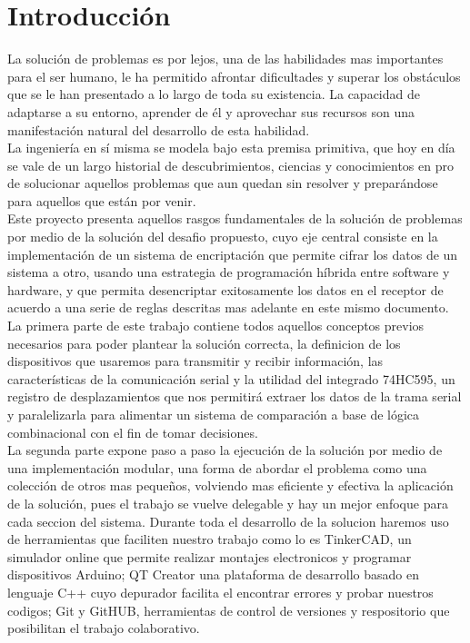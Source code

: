 \documentclass{article}
\begin{document}
\section{Introducción}\label{intro}
La solución de problemas es por lejos, una de las habilidades mas importantes para el ser humano, le ha permitido afrontar dificultades y superar los obstáculos que se le han presentado a lo largo de toda su existencia. La capacidad de adaptarse a su entorno, aprender de él y aprovechar sus recursos son una manifestación natural del desarrollo de esta habilidad.\\
La ingeniería en sí misma se modela bajo esta premisa primitiva, que hoy en día se vale de un largo historial de descubrimientos, ciencias y conocimientos en pro de solucionar aquellos problemas que aun quedan sin resolver y preparándose para aquellos que están por venir.\\

Este proyecto presenta aquellos rasgos fundamentales de la solución de problemas por medio de la solución del desafio propuesto, cuyo eje central consiste en la implementación de un sistema de encriptación que permite cifrar los datos de un sistema a otro, usando una estrategia de programación híbrida entre software y hardware, y que permita desencriptar exitosamente los datos en el receptor de acuerdo a una serie de reglas descritas mas adelante en este mismo documento.\\

La primera parte de este trabajo contiene todos aquellos conceptos previos necesarios para poder plantear la solución correcta, la definicion de los dispositivos que usaremos para transmitir y recibir información, las características de la comunicación serial y la utilidad del integrado 74HC595, un registro de desplazamientos que nos permitirá extraer los datos de la trama serial y paralelizarla para alimentar un sistema de comparación a base de lógica combinacional con el fin de tomar decisiones.\\

La segunda parte expone paso a paso la ejecución de la solución por medio de una implementación modular, una forma de abordar el problema como una colección de otros mas pequeños, volviendo mas eficiente y efectiva la aplicación de la solución, pues el trabajo se vuelve delegable y hay un mejor enfoque para cada seccion del sistema. Durante toda el desarrollo de la solucion haremos uso de herramientas que faciliten nuestro trabajo como lo es TinkerCAD, un simulador online que permite realizar montajes electronicos y programar dispositivos Arduino; QT Creator una plataforma de desarrollo basado en lenguaje C++ cuyo depurador facilita el encontrar errores y probar nuestros codigos; Git y GitHUB, herramientas de control de versiones y respositorio que posibilitan el trabajo colaborativo.
\end{document}
